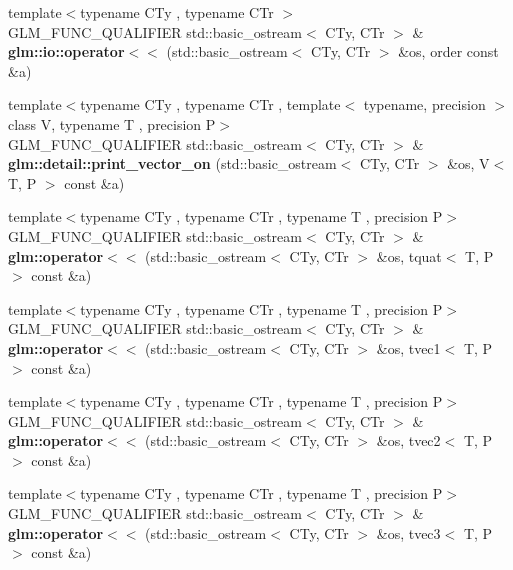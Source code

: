 \begin{DoxyCompactItemize}
\item 
\mbox{\label{io_8inl_a4dab7c825ecbd918643ed9fc9ef4ecb6}} 
{\footnotesize template$<$typename C\+Ty , typename C\+Tr $>$ }\\G\+L\+M\+\_\+\+F\+U\+N\+C\+\_\+\+Q\+U\+A\+L\+I\+F\+I\+ER std\+::basic\+\_\+ostream$<$ C\+Ty, C\+Tr $>$ \& {\bfseries glm\+::io\+::operator$<$$<$} (std\+::basic\+\_\+ostream$<$ C\+Ty, C\+Tr $>$ \&os, order const \&a)
\item 
\mbox{\label{io_8inl_a96bee64577b69e3a541b02df0f591cc1}} 
{\footnotesize template$<$typename C\+Ty , typename C\+Tr , template$<$ typename, precision $>$ class V, typename T , precision P$>$ }\\G\+L\+M\+\_\+\+F\+U\+N\+C\+\_\+\+Q\+U\+A\+L\+I\+F\+I\+ER std\+::basic\+\_\+ostream$<$ C\+Ty, C\+Tr $>$ \& {\bfseries glm\+::detail\+::print\+\_\+vector\+\_\+on} (std\+::basic\+\_\+ostream$<$ C\+Ty, C\+Tr $>$ \&os, V$<$ T, P $>$ const \&a)
\item 
{\footnotesize template$<$typename C\+Ty , typename C\+Tr , typename T , precision P$>$ }\\G\+L\+M\+\_\+\+F\+U\+N\+C\+\_\+\+Q\+U\+A\+L\+I\+F\+I\+ER std\+::basic\+\_\+ostream$<$ C\+Ty, C\+Tr $>$ \& {\bfseries glm\+::operator$<$$<$} (std\+::basic\+\_\+ostream$<$ C\+Ty, C\+Tr $>$ \&os, tquat$<$ T, P $>$ const \&a)
\item 
{\footnotesize template$<$typename C\+Ty , typename C\+Tr , typename T , precision P$>$ }\\G\+L\+M\+\_\+\+F\+U\+N\+C\+\_\+\+Q\+U\+A\+L\+I\+F\+I\+ER std\+::basic\+\_\+ostream$<$ C\+Ty, C\+Tr $>$ \& {\bfseries glm\+::operator$<$$<$} (std\+::basic\+\_\+ostream$<$ C\+Ty, C\+Tr $>$ \&os, tvec1$<$ T, P $>$ const \&a)
\item 
{\footnotesize template$<$typename C\+Ty , typename C\+Tr , typename T , precision P$>$ }\\G\+L\+M\+\_\+\+F\+U\+N\+C\+\_\+\+Q\+U\+A\+L\+I\+F\+I\+ER std\+::basic\+\_\+ostream$<$ C\+Ty, C\+Tr $>$ \& {\bfseries glm\+::operator$<$$<$} (std\+::basic\+\_\+ostream$<$ C\+Ty, C\+Tr $>$ \&os, tvec2$<$ T, P $>$ const \&a)
\item 
{\footnotesize template$<$typename C\+Ty , typename C\+Tr , typename T , precision P$>$ }\\G\+L\+M\+\_\+\+F\+U\+N\+C\+\_\+\+Q\+U\+A\+L\+I\+F\+I\+ER std\+::basic\+\_\+ostream$<$ C\+Ty, C\+Tr $>$ \& {\bfseries glm\+::operator$<$$<$} (std\+::basic\+\_\+ostream$<$ C\+Ty, C\+Tr $>$ \&os, tvec3$<$ T, P $>$ const \&a)

\end{DoxyCompactItemize}
